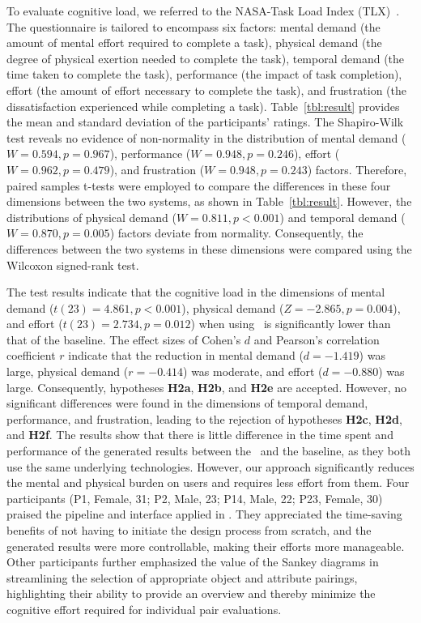 To evaluate cognitive load, we referred to the NASA-Task Load Index (TLX)~\cite{HART1988139}. 
The questionnaire is tailored to encompass six factors: 
mental demand (the amount of mental effort required to complete a task), 
physical demand (the degree of physical exertion needed to complete the task), 
temporal demand (the time taken to complete the task), 
performance (the impact of task completion), 
effort (the amount of effort necessary to complete the task), and frustration (the dissatisfaction experienced while completing a task).
Table~\ref{tbl:result} provides the mean and standard deviation of the participants' ratings.
The Shapiro-Wilk test reveals no evidence of non-normality in the distribution of mental demand ($W = 0.594, p =0.967$), performance ($W = 0.948, p =0.246$), effort ($W = 0.962, p =0.479$), and frustration ($W = 0.948, p =0.243$) factors. Therefore, paired samples t-tests were employed to compare the differences in these four dimensions between the two systems, as shown in Table~\ref{tbl:result}. 
However, the distributions of physical demand ($W = 0.811, p <0.001$) and temporal demand ($W = 0.870, p = 0.005$) factors deviate from normality. Consequently, the differences between the two systems in these dimensions were compared using the Wilcoxon signed-rank test.



The test results indicate that the cognitive load in the dimensions of mental demand ($t(23) = 4.861, p<0.001$), physical demand ($Z = -2.865, p = 0.004$), and effort ($t(23) = 2.734, p = 0.012$) when using \sysname\ is significantly lower than that of the baseline. 
The effect sizes of Cohen's $d$ and Pearson's correlation coefficient $r$ indicate that the reduction in mental demand ($d = -1.419$) was large, physical demand ($r = -0.414$) was moderate, and effort ($d = -0.880$) was large.
Consequently, hypotheses \textbf{H2a}, \textbf{H2b}, and \textbf{H2e} are accepted.
However, no significant differences were found in the dimensions of temporal demand, performance, and frustration, leading to the rejection of hypotheses \textbf{H2c}, \textbf{H2d}, and \textbf{H2f}.
The results show that there is little difference in the time spent and performance of the generated results between the \sysname\ and the baseline, as they both use the same underlying technologies. 
However, our approach significantly reduces the mental and physical burden on users and requires less effort from them. 
Four participants (P1, Female, 31; P2, Male, 23; P14, Male, 22; P23, Female, 30) praised the pipeline and interface applied in \sysname. 
They appreciated the time-saving benefits of not having to initiate the design process from scratch, and the generated results were more controllable, making their efforts more manageable.
Other participants further emphasized the value of the Sankey diagrams in streamlining the selection of appropriate object and attribute pairings, highlighting their ability to provide an overview and thereby minimize the cognitive effort required for individual pair evaluations.



